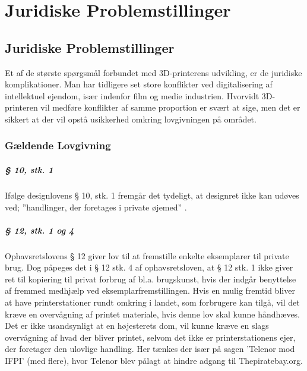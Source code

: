 \chapter{Juridiske Problemstillinger}

\section{Juridiske Problemstillinger}

Et af de største spørgsmål forbundet med 3D-printerens udvikling, er de juridiske komplikationer. Man har tidligere set store konflikter ved digitalisering af intellektuel ejendom, især indenfor film og medie industrien. Hvorvidt 3D-printeren vil medføre konflikter af samme proportion er svært at sige, men det er sikkert at der vil opstå usikkerhed omkring lovgivningen på området.

\subsection{Gældende Lovgivning}

\paragraph{§ 10, stk. 1} %
\label{par:_10_stk_1}


Ifølge designlovens § 10, stk. 1 fremgår det tydeligt, at designret ikke kan udøves ved; ”handlinger, der foretages i private øjemed” \cite{_designloven_????}.

\paragraph{§ 12, stk. 1 og 4} %
\label{par:_12}

 Ophavsretslovens § 12 giver lov til at fremstille enkelte eksemplarer til private brug.
Dog påpeges det i § 12 stk. 4 af ophavsretsloven\cite{jura2}, at § 12 stk. 1 ikke giver ret til kopiering til privat forbrug af bl.a. brugskunst, hvis der indgår benyttelse af fremmed medhjælp ved eksemplarfremstillingen.
Hvis en mulig fremtid bliver at have printerstationer rundt omkring i landet\cite{jura3}, som forbrugere kan tilgå, vil det kræve en overvågning af printet materiale, hvis denne lov skal kunne håndhæves. Det er ikke usandsynligt at en højesterets dom, vil kunne kræve en slags overvågning af hvad der bliver printet, selvom det ikke er printerstationens ejer, der foretager den ulovlige handling. Her tænkes der især på sagen ’Telenor mod IFPI’ (med flere)\cite{jura4}, hvor Telenor blev pålagt at hindre adgang til Thepiratebay.org.

